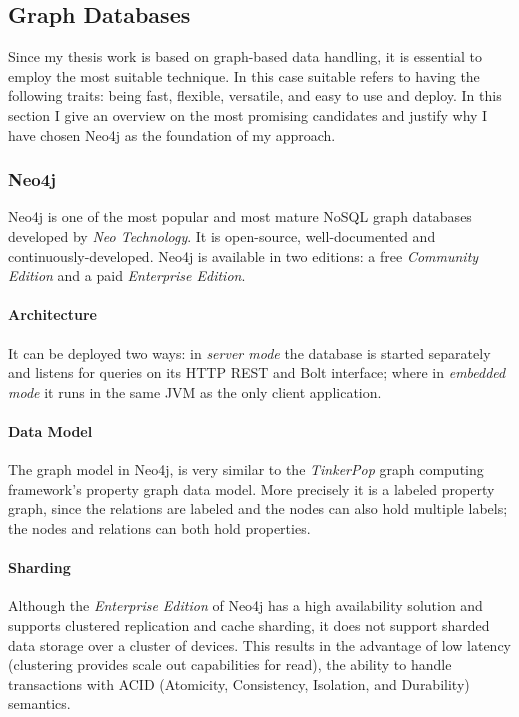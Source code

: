 
\subsection{Graph Databases}
\label{sect:graph-databases}
Since my thesis work is based on graph-based data handling, it is essential to employ the most suitable technique. In this case suitable refers to having the following traits: being fast, flexible, versatile, and easy to use and deploy. In this section I give an overview on the most promising candidates and justify why I have chosen Neo4j as the foundation of my approach.

\subsubsection{Neo4j}
\label{sect:neo4j}
Neo4j is one of the most popular and most mature NoSQL graph databases developed by \emph{Neo Technology}. It is open-source, well-documented and continuously-developed. Neo4j is available in two editions: a free \emph{Community Edition} and a paid \emph{Enterprise Edition}.~\cite{neo4j}

\paragraph{Architecture}
It can be deployed two ways: in \emph{server mode} the database is started separately and listens for queries on its HTTP REST and Bolt interface; where in \emph{embedded mode} it runs in the same JVM as the only client application.

\paragraph{Data Model}
The graph model in Neo4j,  is very similar to the \emph{TinkerPop} graph computing framework's property graph data model. More precisely it is a labeled property graph, since the relations are labeled and the nodes can also hold multiple labels; the nodes and relations can both hold properties.

\paragraph{Sharding}
Although the \emph{Enterprise Edition} of Neo4j has a high availability solution and supports clustered replication and cache sharding, it does not support sharded data storage over a cluster of devices. This results in the advantage of low latency (clustering provides scale out capabilities for read), the ability to handle transactions with ACID (Atomicity, Consistency, Isolation, and Durability) semantics.~\cite{neo4j-product}

